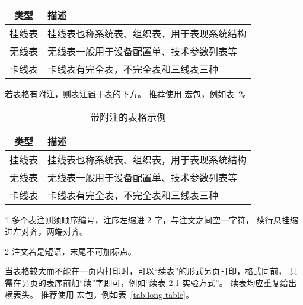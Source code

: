 \begin{table}[h]
  \centering
  \label{tab:example}
  \begin{tabular}{cl}
    \toprule
    类型   & 描述                                       \\
    \midrule
    挂线表 & 挂线表也称系统表、组织表，用于表现系统结构 \\
    无线表 & 无线表一般用于设备配置单、技术参数列表等   \\
    卡线表 & 卡线表有完全表，不完全表和三线表三种       \\
    \bottomrule
  \end{tabular}
\end{table}

若表格有附注，则表注置于表的下方。
推荐使用  宏包，例如表~\ref{tab:table-note}。

\begin{table}[h]
  \centering
  \begin{threeparttable}
    \caption{带附注的表格示例}
    \label{tab:table-note}
    \begin{tabular}{cl}
      \toprule
      类型   & 描述                                       \\
      \midrule
      挂线表\tnote{1} & 挂线表也称系统表、组织表，用于表现系统结构 \\
      无线表\tnote{2} & 无线表一般用于设备配置单、技术参数列表等   \\
      卡线表          & 卡线表有完全表，不完全表和三线表三种       \\
      \bottomrule
    \end{tabular}
    \begin{tablenotes}[online]
      \item[1] 多个表注则须顺序编号，注序左缩进 2 字，与注文之间空一字符，
        续行悬挂缩进左对齐，两端对齐。
      \item[2] 注文若是短语，末尾不可加标点。
    \end{tablenotes}
  \end{threeparttable}
\end{table}

当表格较大而不能在一页内打印时，可以“续表”的形式另页打印，格式同前，
只需在另页的表序前加“续”字即可，例如“续表 2.1 实验方式”。
续表均应重复给出横表头。
推荐使用  宏包，例如表~\ref{tab:long-table}。

